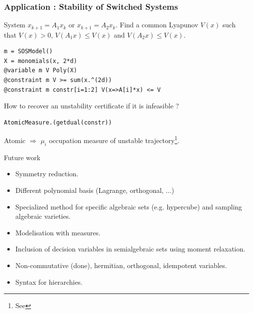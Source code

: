 \documentclass{beamer}
\begin{document}
  \begin{frame}[fragile]
    \frametitle{Application : Stability of Switched Systems}
      System $x_{k+1} = A_1x_k$ or $x_{k+1} = A_2x_k$.
      Find a common Lyapunov $V(x)$ such that $V(x) > 0$, $V(A_1x) \leq V(x)$ and $V(A_2x) \leq V(x)$.
\begin{verbatim}
m = SOSModel()
X = monomials(x, 2*d)
@variable m V Poly(X)
@constraint m V >= sum(x.^(2d))
@constraint m constr[i=1:2] V(x=>A[i]*x) <= V
\end{verbatim}
      How to recover an unstability certificate if it is infeasible ?
\begin{verbatim}
AtomicMeasure.(getdual(constr))
\end{verbatim}
      Atomic $\Rightarrow$ $\mu_i$ occupation measure of unstable trajectory\footnote{See }.
  \end{frame}
  \begin{frame}{Future work}
    \begin{itemize}
      \item Symmetry reduction.
      \item Different polynomial basis (Lagrange, orthogonal, ...)
      \item Specialized method for specific algebraic sets (e.g. hypercube) and sampling algebraic varieties.
      \item Modelisation with measures.
      \item Inclusion of decision variables in semialgebraic sets using moment relaxation.
      \item Non-commutative (done), hermitian, orthogonal, idempotent variables.
      \item Syntax for hierarchies.
    \end{itemize}
  \end{frame}
\end{document}
